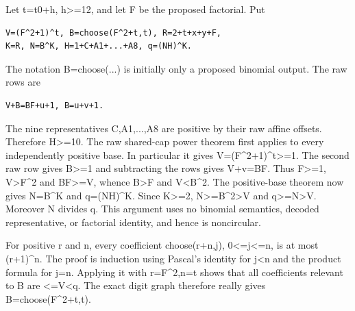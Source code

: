 Let t=\allowbreak{}t0+\allowbreak{}h, h\textgreater{}\allowbreak{}=\allowbreak{}12, and let F be the proposed factorial. Put



\begin{verbatim}
V=(F^2+1)^t, B=choose(F^2+t,t), R=2+t+x+y+F,
K=R, N=B^K, H=1+C+A1+...+A8, q=(NH)^K.
\end{verbatim}

The notation B=\allowbreak{}choose(...) is initially only a proposed binomial output. The raw rows are



\begin{verbatim}
V+B=BF+u+1, B=u+v+1.
\end{verbatim}

The nine representatives C,A1,...,A8 are positive by their raw affine offsets. Therefore H\textgreater{}\allowbreak{}=\allowbreak{}10. The raw shared-cap power theorem first applies to every independently positive base. In particular it gives V=\allowbreak{}(F\textasciicircum{}\allowbreak{}2+\allowbreak{}1)\textasciicircum{}\allowbreak{}t\textgreater{}\allowbreak{}=\allowbreak{}1. The second raw row gives B\textgreater{}\allowbreak{}=\allowbreak{}1 and subtracting the rows gives V+\allowbreak{}v=\allowbreak{}BF. Thus F\textgreater{}\allowbreak{}=\allowbreak{}1, V\textgreater{}\allowbreak{}F\textasciicircum{}\allowbreak{}2 and BF\textgreater{}\allowbreak{}=\allowbreak{}V, whence B\textgreater{}\allowbreak{}F and V\textless{}\allowbreak{}B\textasciicircum{}\allowbreak{}2. The positive-base theorem now gives N=\allowbreak{}B\textasciicircum{}\allowbreak{}K and q=\allowbreak{}(NH)\textasciicircum{}\allowbreak{}K. Since K\textgreater{}\allowbreak{}=\allowbreak{}2, N\textgreater{}\allowbreak{}=\allowbreak{}B\textasciicircum{}\allowbreak{}2\textgreater{}\allowbreak{}V and q\textgreater{}\allowbreak{}=\allowbreak{}N\textgreater{}\allowbreak{}V. Moreover N divides q. This argument uses no binomial semantics, decoded representative, or factorial identity, and hence is noncircular.



For positive r and n, every coefficient choose(r+\allowbreak{}n,j), 0\textless{}\allowbreak{}=\allowbreak{}j\textless{}\allowbreak{}=\allowbreak{}n, is at most (r+\allowbreak{}1)\textasciicircum{}\allowbreak{}n. The proof is induction using Pascal's identity for j\textless{}\allowbreak{}n and the product formula for j=\allowbreak{}n. Applying it with r=\allowbreak{}F\textasciicircum{}\allowbreak{}2,n=\allowbreak{}t shows that all coefficients relevant to B are \textless{}\allowbreak{}=\allowbreak{}V\textless{}\allowbreak{}q. The exact digit graph therefore really gives B=\allowbreak{}choose(F\textasciicircum{}\allowbreak{}2+\allowbreak{}t,t).



